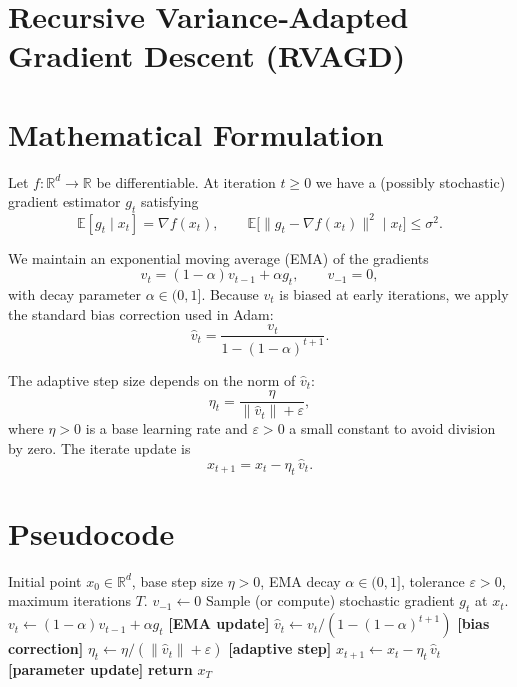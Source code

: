 \documentclass{article}
\newcommand{\E}{\mathbb{E}}
\newcommand{\norm}[1]{\left\lVert #1\right\rVert}
\begin{document}
\section*{Recursive Variance‑Adapted Gradient Descent (RVAGD)}

\section*{Mathematical Formulation}
Let $f:\mathbb{R}^d\to\mathbb{R}$ be differentiable.  
At iteration $t\ge 0$ we have a (possibly stochastic) gradient estimator 
$g_t$ satisfying
\[
\E[g_t\mid x_t]=\nabla f(x_t),\qquad 
\E\bigl[\|g_t-\nabla f(x_t)\|^2\mid x_t\bigr]\le\sigma^2 .
\tag{1}
\]

We maintain an exponential moving average (EMA) of the gradients
\[
v_t = (1-\alpha)v_{t-1}+\alpha g_t,\qquad v_{-1}=0,
\tag{2}
\]
with decay parameter $\alpha\in(0,1]$.  
Because $v_t$ is biased at early iterations, we apply the standard bias
correction used in Adam:
\[
\hat v_t = \frac{v_t}{1-(1-\alpha)^{t+1}} .
\tag{3}
\]

The adaptive step size depends on the norm of $\hat v_t$:
\[
\eta_t = \frac{\eta}{\norm{\hat v_t}+\varepsilon},
\tag{4}
\]
where $\eta>0$ is a base learning rate and $\varepsilon>0$ a small constant
to avoid division by zero.  
The iterate update is
\[
x_{t+1}=x_t-\eta_t\,\hat v_t .
\tag{5}
\]

\section*{Pseudocode}
\begin{algorithm}[H]
\caption{Recursive Variance‑Adapted Gradient Descent (RVAGD)}
\begin{algorithmic}[1]
\Require Initial point $x_0\in\mathbb{R}^d$, base step size $\eta>0$, 
EMA decay $\alpha\in(0,1]$, tolerance $\varepsilon>0$, 
maximum iterations $T$.
\State $v_{-1}\gets 0$
    \State Sample (or compute) stochastic gradient $g_t$ at $x_t$.
    \State $v_t \gets (1-\alpha)v_{t-1}+\alpha g_t$ \hfill\textbf{[EMA update]}
    \State $\hat v_t \gets v_t/(1-(1-\alpha)^{t+1})$ \hfill\textbf{[bias correction]}
    \State $\eta_t \gets \eta/(\norm{\hat v_t}+\varepsilon)$ \hfill\textbf{[adaptive step]}
    \State $x_{t+1} \gets x_t-\eta_t\,\hat v_t$ \hfill\textbf{[parameter update]}
\EndFor
\State \textbf{return} $x_T$
\end{algorithmic}
\end{algorithm}
\end{document}
